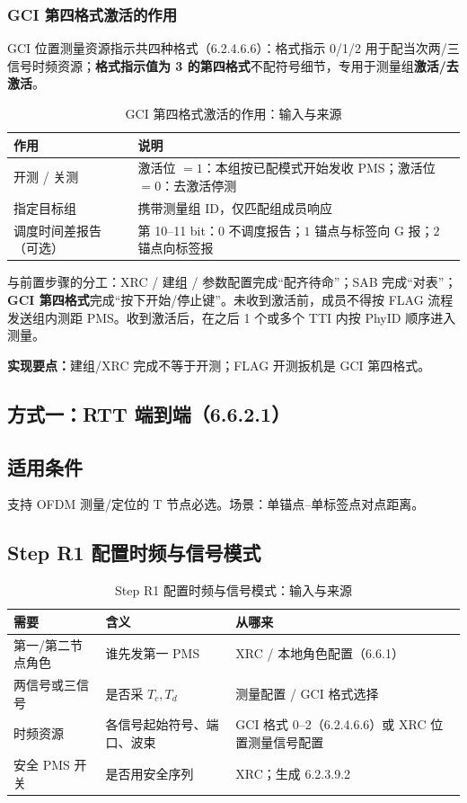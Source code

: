 \documentclass[11pt,a4paper]{ctexart}
\begin{document}
\subsubsection{GCI 第四格式激活的作用}

GCI 位置测量资源指示共四种格式（6.2.4.6.6）：格式指示 0/1/2 用于配当次两/三信号时频资源；\textbf{格式指示值为 3 的第四格式}不配符号细节，专用于测量组\textbf{激活/去激活}。

\begin{longtable}{L{3cm}L{10cm}}
\caption{GCI 第四格式激活的作用：输入与来源\label{tab:step101}} \\
\toprule
\textbf{作用} & \textbf{说明} \\
\midrule
开测 / 关测 & 激活位 $=1$：本组按已配模式开始发收 PMS；激活位 $=0$：去激活停测 \\
指定目标组 & 携带测量组 ID，仅匹配组成员响应 \\
调度时间差报告（可选） & 第 10--11 bit：$0$ 不调度报告；$1$ 锚点与标签向 G 报；$2$ 锚点向标签报 \\
\bottomrule
\end{longtable}

与前置步骤的分工：XRC / 建组 / 参数配置完成``配齐待命''；SAB 完成``对表''；\textbf{GCI 第四格式}完成``按下开始/停止键''。未收到激活前，成员不得按 FLAG 流程发送组内测距 PMS。收到激活后，在之后 1 个或多个 TTI 内按 PhyID 顺序进入测量。

\noindent\textbf{实现要点：}建组/XRC 完成不等于开测；FLAG 开测扳机是 GCI 第四格式。

\subsection{方式一：RTT 端到端（6.6.2.1）}

\subsection{适用条件}

支持 OFDM 测量/定位的 T 节点必选。场景：单锚点--单标签点对点距离。

\subsection{Step R1 配置时频与信号模式}

\begin{longtable}{L{3cm}L{5.5cm}L{4.5cm}}
\caption{Step R1 配置时频与信号模式：输入与来源\label{tab:step102}} \\
\toprule
\textbf{需要} & \textbf{含义} & \textbf{从哪来} \\
\midrule
第一/第二节点角色 & 谁先发第一 PMS & XRC / 本地角色配置（6.6.1） \\
两信号或三信号 & 是否采 $T_c,T_d$ & 测量配置 / GCI 格式选择 \\
时频资源 & 各信号起始符号、端口、波束 & GCI 格式 0--2（6.2.4.6.6）或 XRC 位置测量信号配置 \\
安全 PMS 开关 & 是否用安全序列 & XRC；生成 6.2.3.9.2 \\
\bottomrule
\end{longtable}
\end{document}
